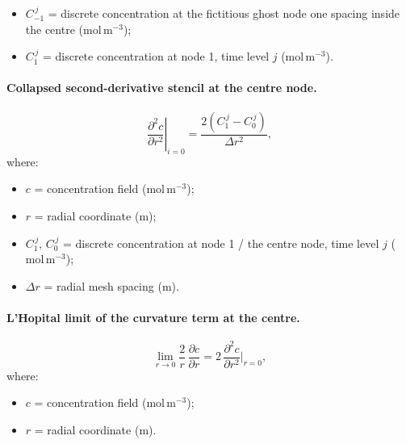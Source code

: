 \documentclass[11pt,a4paper]{article}
\newcommand{\conc}{c}
\newcommand{\pd}[2]{\frac{\partial #1}{\partial #2}}
\newcommand{\pdd}[2]{\frac{\partial^{2} #1}{\partial #2^{2}}}
\newcommand{\dr}{\Delta r}
\begin{document}
\begin{itemize}[leftmargin=1.6em,itemsep=1pt,topsep=3pt,parsep=0pt]
  \item $C_{-1}^{\,j}$ = discrete concentration at the fictitious ghost node one spacing inside the centre ($\mathrm{mol\,m^{-3}}$);
  \item $C_1^{\,j}$ = discrete concentration at node 1, time level $j$ ($\mathrm{mol\,m^{-3}}$).
\end{itemize}


\paragraph{Collapsed second-derivative stencil at the centre node.}

\begin{equation}
\left.\pdd{\conc}{r}\right|_{i=0} = \frac{2\left(C_1^{\,j} - C_0^{\,j}\right)}{\dr^{2}},
\label{eq:centre-stencil}
\end{equation}
\vspace{-0.3em}
\noindent where:

\begin{itemize}[leftmargin=1.6em,itemsep=1pt,topsep=3pt,parsep=0pt]
  \item $c$ = concentration field ($\mathrm{mol\,m^{-3}}$);
  \item $r$ = radial coordinate ($\mathrm{m}$);
  \item $C_1^{\,j},\,C_0^{\,j}$ = discrete concentration at node 1 / the centre node, time level $j$ ($\mathrm{mol\,m^{-3}}$);
  \item $\dr$ = radial mesh spacing ($\mathrm{m}$).
\end{itemize}


\paragraph{L'Hopital limit of the curvature term at the centre.}

\begin{equation}
  \lim_{r\to 0} \frac{2}{r}\,\pd{\conc}{r}
  = 2\,\pdd{\conc}{r}\bigg|_{r=0},
  \label{eq:lhopital}
\end{equation}
\vspace{-0.3em}
\noindent where:

\begin{itemize}[leftmargin=1.6em,itemsep=1pt,topsep=3pt,parsep=0pt]
  \item $c$ = concentration field ($\mathrm{mol\,m^{-3}}$);
  \item $r$ = radial coordinate ($\mathrm{m}$).
\end{itemize}
\end{document}
